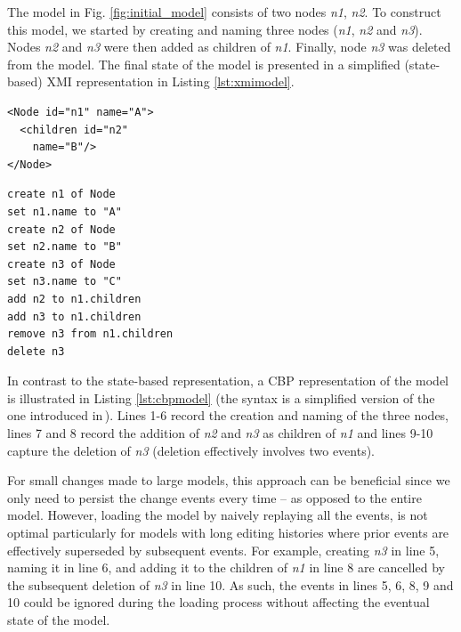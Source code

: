 \documentclass{llncs}
\begin{document}
The model in Fig. \ref{fig:initial_model} consists of two nodes \emph{n1}, \emph{n2}.
To construct this model, we started by creating and naming three nodes (\emph{n1}, \emph{n2} and \emph{n3}).
Nodes \emph{n2} and \emph{n3} were then added as children of \emph{n1}.
Finally, node \emph{n3} was deleted from the model.
The final state of the model is presented in a simplified (state-based) XMI representation in Listing \ref{lst:xmimodel}.

\noindent
\begin{minipage}[t]{0.34\linewidth}
\begin{lstlisting}[style=xmi,caption={State-based representation of the tree model in (simplified) XMI.},label=lst:xmimodel]
<Node id="n1" name="A">
  <children id="n2" 
    name="B"/>
</Node>
\end{lstlisting}
\end{minipage}
\hfill
\begin{minipage}[t]{0.635\linewidth}
\begin{lstlisting}[style=eol,caption={Change-based representation of the tree model.},label=lst:cbpmodel]
create n1 of Node
set n1.name to "A"      
create n2 of Node
set n2.name to "B"      
create n3 of Node
set n3.name to "C"      
add n2 to n1.children   
add n3 to n1.children
remove n3 from n1.children   
delete n3
\end{lstlisting}
\end{minipage}

In contrast to the state-based representation, a CBP representation of the model is illustrated in Listing \ref{lst:cbpmodel} (the syntax is a simplified version of the one introduced in\,\cite{yohannis2017turning}).
Lines 1-6 record the creation and naming of the three nodes, lines 7 and 8 record the addition of \emph{n2} and \emph{n3} as children of \emph{n1} and lines 9-10 capture the deletion of \emph{n3} (deletion effectively involves two events).


For small changes made to large models, this approach can be beneficial since we only need to persist the change events every time -- as opposed to the entire model.
However, loading the model by naively replaying all the events,\cite{yohannis2017turning} is not optimal particularly for models with long editing histories where prior events are effectively superseded by subsequent events. For example, creating \emph{n3} in line 5, naming it in line 6, and adding it to the children of \emph{n1} in line 8 are cancelled by the subsequent deletion of \emph{n3} in line 10. As such, the events in lines 5, 6, 8, 9 and 10 could be ignored during the loading process without affecting the eventual state of the model.
\end{document}
